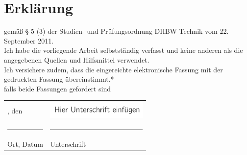 \section*{Erklärung}

gemäß § 5 (3) der \glqq Studien- und Prüfungsordnung DHBW Technik\grqq{} vom 22. September 2011.\vspace*{\baselineskip}\\
Ich habe die vorliegende Arbeit selbstständig verfasst und keine anderen als die angegebenen Quellen und Hilfsmittel verwendet.\vspace*{\baselineskip}\\
Ich versichere zudem, dass die eingereichte elektronische Fassung mit der gedruckten Fassung übereinstimmt.*\vspace*{\baselineskip}\\
{\footnotesize * falls beide Fassungen gefordert sind}\\
\begin{tabularx}{\textwidth}{ll}
	\ort, den \abgabedatum & \includegraphics[width=5cm]{bilder/unterschrift.png} \\
	\rule{7cm}{1pt} & \rule{5cm}{1pt}\\
	Ort, Datum & Unterschrift
\end{tabularx}
